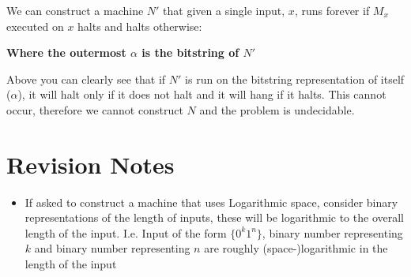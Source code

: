 \documentclass{article}
\begin{document}
      We can construct a machine $N'$ that given a single input, $x$, runs forever if $M_{x}$ executed on $x$ halts and halts otherwise:

      \begin{center}
      \end{center}
      \textbf{Where the outermost $\alpha$ is the bitstring of $N'$}


      Above you can clearly see that if $N'$ is run on the bitstring representation of itself ($\alpha $), it will halt only if it does not halt and it will hang if it halts. This cannot occur, therefore we cannot construct $N$ and the problem is undecidable.

      \section{Revision Notes}

      \begin{itemize}
        \item If asked to construct a machine that uses Logarithmic space, consider binary representations of the length of inputs, these will be logarithmic to the overall length of the input. I.e.
              Input of the form $\{ 0^{k}1^{n} \} $, binary number representing $k$ and binary number representing $n$ are roughly (space-)logarithmic in the length of the input
      \end{itemize}
\end{document}
